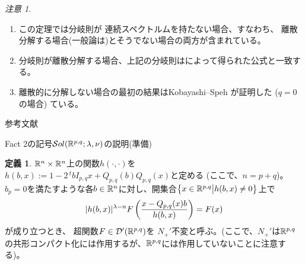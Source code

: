 \documentclass[notheorems]{beamer}
\renewcommand{\Q}{Q_{p,q}}
\newcommand{\sol}{\mathcal{S}ol(\R^{p,q};\lambda,\nu)}
\theoremstyle{definition}
\newtheorem{definition}{{定義}}
\theoremstyle{example}
\theoremstyle{remark}
\newtheorem*{remark}{注意}
\theoremstyle{mystyle}
\begin{document}
\begin{frame}
\begin{remark}
	\begin{enumerate}[(1)]
		\item この定理では分岐則が
			連続スペクトルムを持たない場合、すなわち、
			離散分解する場合(一般論は\cite{10.2307/120963})とそうでない場合の両方が含まれている。
		\item 分岐則が離散分解する場合、上記の分岐則は\cite[Thm. 3.3]{kobayashi1993}によって得られた公式と一致する。
		\item 
			離散的に分解{しない}場合の最初の結果はKobayashi--Speh
			\cite[Thms. 12.1 and 1.3]{kobayashi2015symmetry}
			が証明した ($q=0$の場合)
			ている。
	\end{enumerate}
	\vspace{-0.8em}
\end{remark}
\end{frame}

\begin{frame}[allowframebreaks]{参考文献}
	
\end{frame}

\begin{frame}{Fact 2の記号$\sol$の説明(準備)}
\begin{definition} \label{def1}
	$\mathbb{R}^n\times\mathbb{R}^n$上の関数$h(\cdot,\cdot)$を
	$h(b,x):=1-2\,^t\!bI_{p,q}x+\Q(b)\Q(x)$と定める (ここで、$n=p+q$)。 
	$b_p=0$を満たすよう{な}各$b\in\mathbb{R}^n$に対し、開集合$\left\{x\in\mathbb{R}^{p,q}\big| h(b,x)\neq0\right\}$上で
	\vspace{-1em}
  \begin{equation*}
    \label{eq-Nequiv} | h(b,x) |^{\lambda - n} F \left(
    \frac{x - \Q (x) b}{h(b,x)} \right) = F (x)
	\vspace{-1em}
  \end{equation*}
  が成り立つとき、
	超関数$F \in \mathcal{D}' (\mathbb{R}^{p,q})$を
	{$N_+'$不変}と呼ぶ。(ここで、$N_+'$は$\mathbb{R}^{p,q}$の共形コンパクト化には作用するが、$\mathbb{R}^{p,q}$には作用していないことに注意する)。
\end{definition}
\end{frame}
\end{document}
